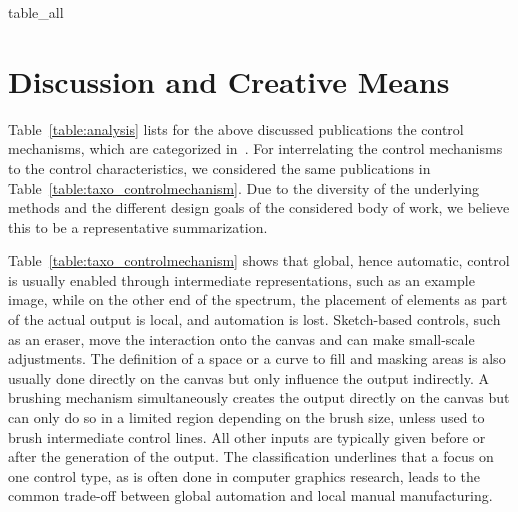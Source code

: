 
{table_all}


\section{Discussion and Creative Means}
\label{sec:discussion_creative_means}

Table~\ref{table:analysis} lists for the above discussed publications the control mechanisms, which are categorized in~. For interrelating the control mechanisms to the control characteristics, we considered the same publications in Table~\ref{table:taxo_controlmechanism}. Due to the diversity of the underlying methods and the different design goals of the considered body of work, we believe this to be a representative summarization.


Table~\ref{table:taxo_controlmechanism} shows that global, hence automatic, control is usually enabled through intermediate representations, such as an example image, while on the other end of the spectrum, the placement of elements as part of the actual output is local, and automation is lost.  Sketch-based controls, such as an eraser, move the interaction onto the canvas and can make small-scale adjustments. The definition of a space or a curve to fill and masking areas is also usually done directly on the canvas but only influence the output indirectly. A brushing mechanism simultaneously creates the output directly on the canvas but can only do so in a limited region depending on the brush size, unless used to brush intermediate control lines. All other inputs are typically given before or after the generation of the output. The classification underlines that a focus on one control type, as is often done in computer graphics research, leads to the common trade-off between global automation and local manual manufacturing.

